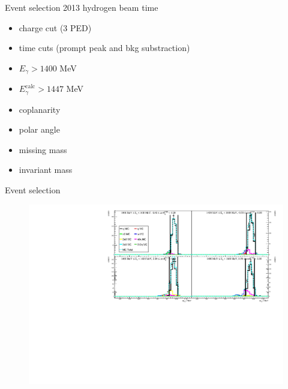 \documentclass[11pt,aspectratio=169,dvipsnames]{beamer}
\begin{document}
\begin{frame}{Event selection}
	2013 hydrogen beam time
	\begin{itemize}
		\item charge cut (3 PED)
		\item time cuts (prompt peak and bkg substraction)
		\item $E_\gamma > 1400$ MeV
		\item  $E_\gamma^\text{calc}>1447$ MeV
		\item coplanarity
		\item polar angle
		\item missing mass
		\item  invariant mass
	\end{itemize}
\end{frame}
\begin{frame}{Event selection}
\begin{figure}
	\centering
	\includegraphics[width=\linewidth]{invcut_ebin0}
\end{figure}

\end{frame}
\end{document}
